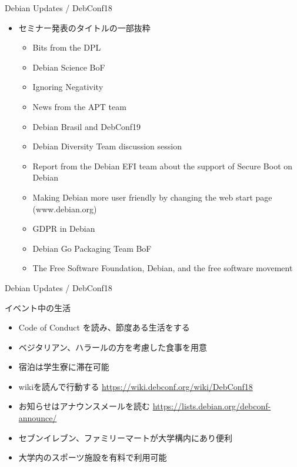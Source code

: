 \begin{frame}{Debian Updates / DebConf18}%

\begin{itemize}
\item セミナー発表のタイトルの一部抜粋
  \begin{itemize}
  \item Bits from the DPL
  \item Debian Science BoF
  \item Ignoring Negativity
  \item News from the APT team
  \item Debian Brasil and DebConf19
  \item Debian Diversity Team discussion session
  \item Report from the Debian EFI team about the support of Secure Boot on Debian
  \item Making Debian more user friendly by changing the web start page (www.debian.org)
  \item GDPR in Debian
  \item Debian Go Packaging Team BoF
  \item The Free Software Foundation, Debian, and the free software movement
  \end{itemize}
\end{itemize}

\end{frame}


\begin{frame}{Debian Updates / DebConf18}%

イベント中の生活
\begin{itemize}
  \item Code of Conduct を読み、節度ある生活をする
  \item ベジタリアン、ハラールの方を考慮した食事を用意
  \item 宿泊は学生寮に滞在可能
  \item wikiを読んで行動する \url{https://wiki.debconf.org/wiki/DebConf18}
  \item お知らせはアナウンスメールを読む \url{https://lists.debian.org/debconf-announce/}
  \item セブンイレブン、ファミリーマートが大学構内にあり便利
  \item 大学内のスポーツ施設を有料で利用可能
\end{itemize}

\end{frame}


